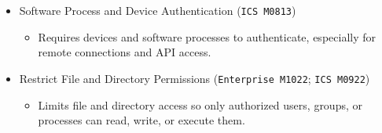 \documentclass[10pt,a4paper,oneside]{report}
\begin{document}
\begin{itemize}
\begin{itemize}
\begin{itemize}
\end{itemize}
\item Software Process and Device Authentication (\texttt{ICS M0813})
\begin{itemize}
\item Requires devices and software processes to authenticate, especially for remote connections and API access.
\end{itemize}
\item Restrict File and Directory Permissions (\texttt{Enterprise M1022}; \texttt{ICS M0922})
\begin{itemize}
\item Limits file and directory access so only authorized users, groups, or processes can read, write, or execute them.
\end{itemize}
\end{itemize}
\end{itemize}
\end{document}
